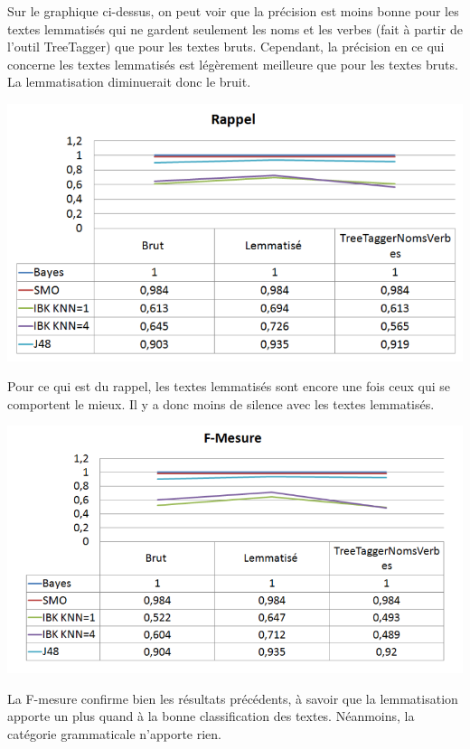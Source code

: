 \documentclass[a4paper,11pt]{article}
\begin{document}
Sur le graphique ci-dessus, on peut voir que la précision est moins bonne pour les textes lemmatisés qui ne gardent seulement les noms et les verbes (fait à partir de l’outil TreeTagger) que pour les textes bruts. Cependant, la précision en ce qui concerne les textes lemmatisés est légèrement meilleure que pour les textes bruts. La lemmatisation diminuerait donc le bruit.

\begin{center}
\includegraphics[scale=0.4]{rappel.png}
\end{center}

Pour ce qui est du rappel, les textes lemmatisés sont encore une fois ceux qui se comportent le mieux. Il y a donc moins de silence avec les textes lemmatisés.

\begin{center}
\includegraphics[scale=0.4]{fmesure.png}
\end{center}

La F-mesure confirme bien les résultats précédents, à savoir que la lemmatisation apporte un plus quand à la bonne classification des textes. Néanmoins, la catégorie grammaticale n’apporte rien.
\end{document}
